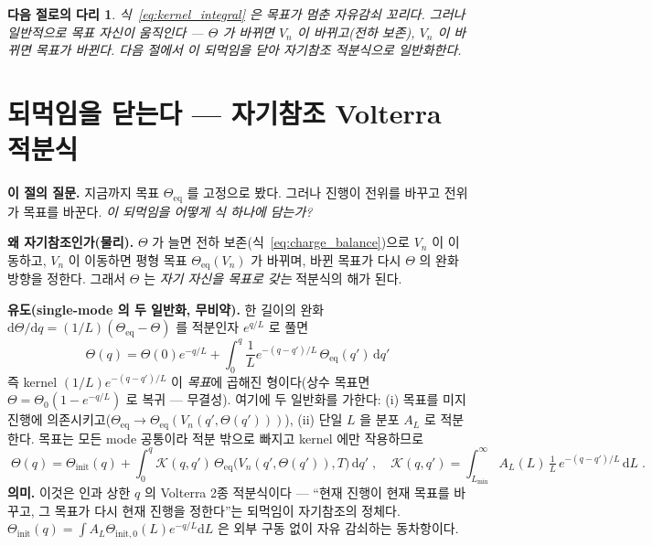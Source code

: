 \documentclass[11pt,a4paper]{article}
\newtheorem*{bridgebox}{다음 절로의 다리}
\newcommand{\dd}{\mathrm{d}}
\newcommand{\eq}{\mathrm{eq}}
\begin{document}
\begin{bridgebox}
식~\eqref{eq:kernel_integral} 은 목표가 \emph{멈춘} 자유감쇠 꼬리다. 그러나 일반적으로 목표 자신이 움직인다 —
$\Theta$ 가 바뀌면 $V_n$ 이 바뀌고(전하 보존), $V_n$ 이 바뀌면 목표가 바뀐다. 다음 절에서 이 되먹임을 닫아
자기참조 적분식으로 일반화한다.
\end{bridgebox}

\section{되먹임을 닫는다 — 자기참조 Volterra 적분식}\label{sec:volterra}
\textbf{이 절의 질문.} 지금까지 목표 $\Theta_\eq$ 를 고정으로 봤다. 그러나 진행이 전위를 바꾸고 전위가 목표를
바꾼다. \emph{이 되먹임을 어떻게 식 하나에 담는가?}

\textbf{왜 자기참조인가(물리).} $\Theta$ 가 늘면 전하 보존(식~\eqref{eq:charge_balance})으로 $V_n$ 이
이동하고, $V_n$ 이 이동하면 평형 목표 $\Theta_\eq(V_n)$ 가 바뀌며, 바뀐 목표가 다시 $\Theta$ 의 완화 방향을
정한다. 그래서 $\Theta$ 는 \emph{자기 자신을 목표로 갖는} 적분식의 해가 된다.

\textbf{유도(single-mode 의 두 일반화, 무비약).} 한 길이의 완화 $\dd\Theta/\dd q=(1/L)(\Theta_\eq-\Theta)$
를 적분인자 $e^{q/L}$ 로 풀면
\begin{equation}
\Theta(q)=\Theta(0)e^{-q/L}+\int_0^q \frac1L e^{-(q-q')/L}\,\Theta_\eq(q')\,\dd q'
\label{eq:singlemode_integral}
\end{equation}
즉 kernel $(1/L)e^{-(q-q')/L}$ 이 \emph{목표}에 곱해진 형이다(상수 목표면 $\Theta=\Theta_0(1-e^{-q/L})$ 로
복귀 — 무결성). 여기에 두 일반화를 가한다: (i) 목표를 미지 진행에 의존시키고($\Theta_\eq\to\Theta_\eq(V_n(q',
\Theta(q')))$), (ii) 단일 $L$ 을 분포 $A_L$ 로 적분한다. 목표는 모든 mode 공통이라 적분 밖으로 빠지고 kernel
에만 작용하므로
\begin{equation}
\boxed{\;\Theta(q)=\Theta_\mathrm{init}(q)+\int_0^q \mathcal K(q,q')\,\Theta_\eq\big(V_n(q',\Theta(q')),T\big)\,\dd q'\;,\quad
\mathcal K(q,q')=\int_{L_{\min}}^\infty A_L(L)\,\tfrac1L\,e^{-(q-q')/L}\,\dd L\;.}
\label{eq:volterra}
\end{equation}
\textbf{의미.} 이것은 인과 상한 $q$ 의 Volterra 2종 적분식이다 — ``현재 진행이 현재 목표를 바꾸고, 그 목표가
다시 현재 진행을 정한다''는 되먹임이 자기참조의 정체다. $\Theta_\mathrm{init}(q)=\int A_L\Theta_{\mathrm{init},0}
(L)e^{-q/L}\dd L$ 은 외부 구동 없이 자유 감쇠하는 동차항이다.
\end{document}
